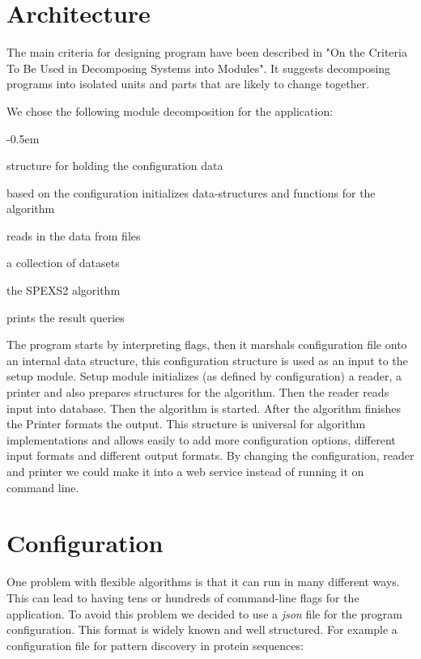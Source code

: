 \section{Architecture}

The main criteria for designing program have been described in "On the Criteria To Be Used in Decomposing Systems into Modules"\cite{Parnas72}. It suggests decomposing programs into isolated units and parts that are likely to change together.

We chose the following module decomposition for the application:

\begin{small}
\begin{description}
    \itemsep-0.5em
    \item[Configuration] structure for holding the configuration data
    \item[Setup] based on the configuration initializes data-structures and functions for the algorithm
    \item[Reader] reads in the data from files
    \item[Database] a collection of datasets
    \item[Algorithm] the SPEXS2 algorithm
    \item[Printer] prints the result queries
\end{description}
\end{small}

The program starts by interpreting flags, then it marshals configuration file onto an internal data structure, this configuration structure is used as an input to the setup module. Setup module initializes (as defined by configuration) a reader, a printer and also prepares structures for the algorithm. Then the reader reads input into database. Then the algorithm is started. After the algorithm finishes the Printer formats the output. This structure is universal for algorithm implementations and allows easily to add more configuration options, different input formats and different output formats. By changing the configuration, reader and printer we could make it into a web service instead of running it on command line.

\section{Configuration}

One problem with flexible algorithms is that it can run in many different ways. This can lead to having tens or hundreds of command-line flags for the application. To avoid this problem we decided to use a \emph{json}\cite{json} file for the program configuration. This format is widely known and well structured. For example a configuration file for pattern discovery in protein sequences:

